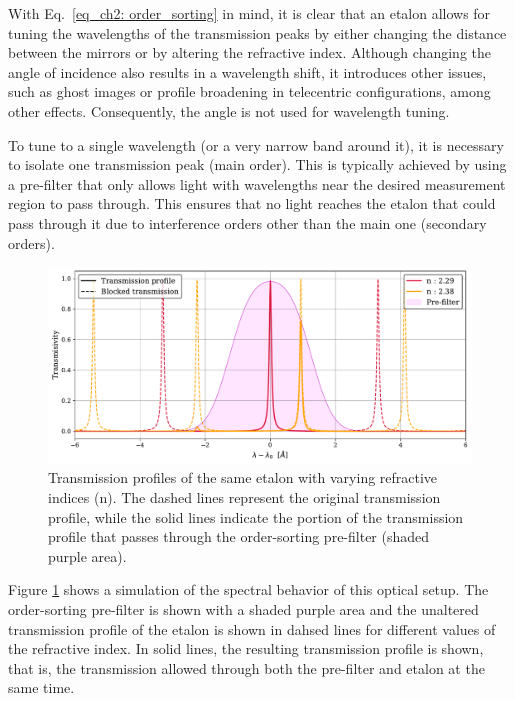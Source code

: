With Eq.~\eqref{eq_ch2: order_sorting} in mind, it is clear that an etalon allows for tuning the wavelengths of the transmission peaks by either changing the distance between the mirrors or by altering the refractive index. Although changing the angle of incidence also results in a wavelength shift, it introduces other issues, such as ghost images or profile broadening in telecentric configurations, among other effects. Consequently, the angle is not used for wavelength tuning.

To tune to a single wavelength (or a very narrow band around it), it is necessary to isolate one transmission peak (main order). This is typically achieved by using a pre-filter that only allows light with wavelengths near the desired measurement region to pass through. This ensures that no light reaches the etalon that could pass through it due to interference orders other than the main one (secondary orders). 

\begin{figure}
  \centering
  \includegraphics[width = \textwidth]{figures/Introduction_to_spectropolarimeters/Etalon_and_prefilter_example.pdf}
  \caption{Transmission profiles of the same etalon with varying refractive indices (n). The dashed lines represent the original transmission profile, while the solid lines indicate the portion of the transmission profile that passes through the order-sorting pre-filter (shaded purple area).} 
  \label{fig_ch2: etalon_example}
\end{figure}

Figure \ref{fig_ch2: etalon_example} shows a simulation of the spectral behavior of this optical setup. The order-sorting pre-filter is shown with a shaded purple area and the unaltered transmission profile of the etalon is shown in dahsed lines for different values of the refractive index. In solid lines, the resulting transmission profile is shown, that is, the transmission allowed through both the pre-filter and etalon at the same time. 

